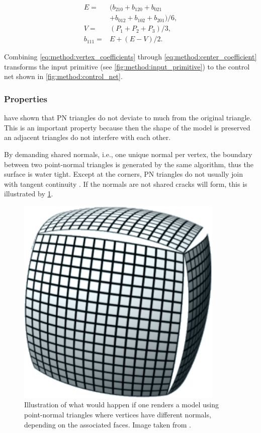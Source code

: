\begin{align}\label{eq:method:center_coefficient}
	E = {}& (b_{210} + b_{120} + b_{021} \nonumber \\
		{}& + b_{012} + b_{102} + b_{201}) / 6, \nonumber\\
	V = {}& (P_1 + P_2 + P_3) / 3, \\
	b_{111} = {}& E + (E - V) / 2. \nonumber
\end{align}

Combining \eqref{eq:method:vertex_coefficients} through \eqref{eq:method:center_coefficient} transforms the input primitive (see \cref{fig:method:input_primitive}) to the control net shown in \cref{fig:method:control_net}.

\subsubsection{Properties}

\citeauthor{vlachos2001curved} have shown that PN triangles do not deviate to much from the original triangle. This is an important property because then the shape of the model is preserved an adjacent triangles do not interfere with each other. 

By demanding shared normals, i.e., one unique normal per vertex, the boundary between two point-normal triangles is generated by the same algorithm, thus the surface is water tight. Except at the corners, PN triangles do not usually join with tangent continuity \cite{vlachos2001curved}. If the normals are not shared cracks will form, this is illustrated by \cref{fig:method:cracks}.

\begin{figure}
	\centering
	\includegraphics[width=0.4\columnwidth]{./content/img/method/cracks.png}
	\caption{Illustration of what would happen if one renders a model using point-normal triangles where vertices have different normals, depending on the associated faces. Image taken from \cite{mcdonald2010crack}.}
	\label{fig:method:cracks}
\end{figure}
